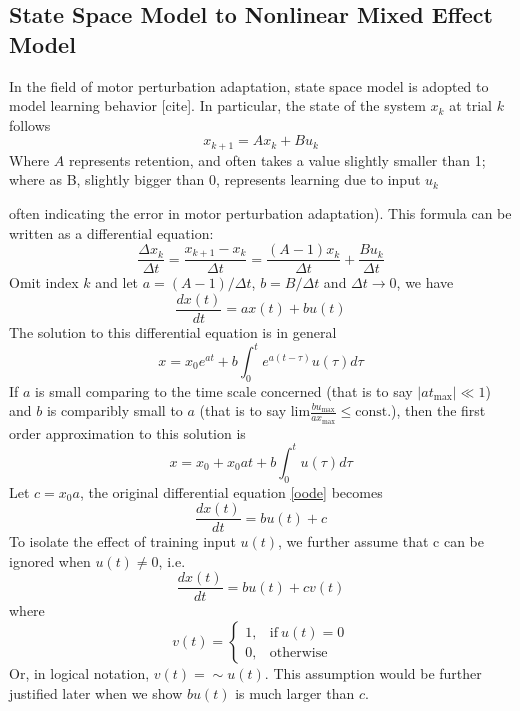\subsection{State Space Model to Nonlinear Mixed Effect Model}
In the field of motor perturbation adaptation, state space model is adopted to model learning behavior [cite]. 
In particular, the state of the system $ x_k $ at trial $ k $ follows 
\begin{equation}\label{ssm}
	x_{k+1} = Ax_k + Bu_k
\end{equation}
Where $ A $ represents retention, and often takes a value slightly smaller than 1; 
where as B, slightly bigger than 0, represents learning due to input $ u_k $ {often indicating the error in motor perturbation adaptation).
This formula can be written as a differential equation:
\begin{equation}
	\frac{\Delta x_k}{\Delta t} = \frac{x_{k+1}-x_k}{\Delta t} = \frac{(A-1)x_k}{\Delta t} + \frac{Bu_k}{\Delta t}
\end{equation}
Omit index $ k $ and let $ a = (A-1)/\Delta t $, $ b = B/\Delta t $ and $ \Delta t\rightarrow 0 $, we have
\begin{equation}\label{oode}
	\frac{dx(t)}{dt} = ax(t)+bu(t)
\end{equation}
The solution to this differential equation is in general
\begin{equation}\label{generalsolution}
	x = x_0e^{at} + b\int_0^t e^{a(t-\tau)}u(\tau)d\tau
\end{equation}
If $ a $ is small comparing to the time scale concerned (that is to say $ |at_{\text{max}}| \ll 1 $) and $ b $ is comparibly small to $ a $ (that is to say $ \text{lim}\frac{bu_\text{max}}{ax_\text{max}} \leqslant \text{const.} $), then the first order approximation to this solution is
\begin{equation}\label{specialsolution}
	x = x_0 + x_0at + b \int_0^t u(\tau)d\tau
\end{equation}
Let $ c=x_0 a $, the original differential equation \ref{oode} becomes
\begin{equation}
	\frac{dx(t)}{dt} = bu(t) + c
\end{equation}
To isolate the effect of training input $ u(t) $, we further assume that c can be ignored when $ u(t) \neq 0 $, i.e.
\begin{equation}\label{fode}
	\frac{dx(t)}{dt} = bu(t) + cv(t)
\end{equation}
where
\begin{equation}
v(t) = 
\begin{cases}
	1, & \text{if}\ u(t) = 0 \\
	0, & \text{otherwise}
\end{cases}
\end{equation}
Or, in logical notation, $ v(t) = \sim u(t) $. 
This assumption would be further justified later when we show $ bu(t) $ is much larger than $ c $.

}
